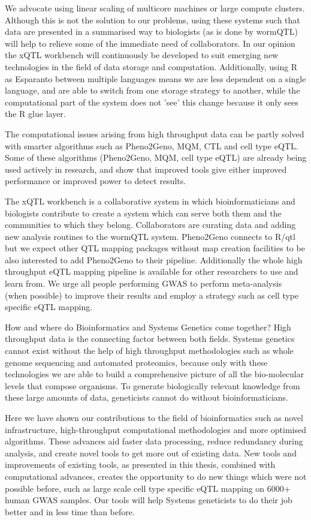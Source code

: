We advocate using linear scaling of multicore machines or large compute clusters. Although this is not the solution to our problems, using these 
systems such that data are presented in a summarised way to biologists (as is done by wormQTL) will help to relieve some of the immediate need 
of collaborators. In our opinion the xQTL workbench will continuously be developed to suit emerging new technologies in the field of data storage 
and computation. Additionally, using R as Esparanto between multiple languages means we are less dependent on a single language, and are able to 
switch from one storage strategy to another, while the computational part of the system does not 'see' this change because it only sees the R 
glue layer.

The computational issues arising from high throughput data can be partly solved with smarter algorithms such as Pheno2Geno, MQM, CTL and cell type eQTL. 
Some of these algorithms (Pheno2Geno, MQM, cell type eQTL) are already being used actively in research, and show that improved tools give either improved 
performance or improved power to detect results. 

The xQTL workbench is a collaborative system in which bioinformaticians and biologists contribute to create a system which can serve both them and 
the communities to which they belong. Collaborators are curating data and adding new analysis routines to the wormQTL system. Pheno2Geno connects to R/qtl 
but we expect other QTL mapping packages without map creation facilities to be also interested to add Pheno2Geno to their pipeline. Additionally the 
whole high throughput eQTL mapping pipeline is available for other researchers to use and learn from. We urge all people performing GWAS to perform 
meta-analysis (when possible) to improve their results and employ a strategy such as cell type specific eQTL mapping. 

How and where do Bioinformatics and Systems Genetics come together? High throughput data is the connecting factor between both fields. Systems 
genetics cannot exist without the help of high throughput methodologies such as whole genome sequencing and automated proteomics, because only 
with these technologies we are able to build a comprehensive picture of all the bio-molecular levels that compose organisms. To generate 
biologically relevant knowledge from these large amounts of data, geneticists cannot do without bioinformaticians. 

Here we have shown our contributions to the field of bioinformatics such as novel infrastructure, high-throughput computational methodologies and 
more optimised algorithms. These advances aid faster data processing, reduce redundancy during analysis, and create novel tools to get more out 
of existing data. New tools and improvements of existing tools, as presented in this thesis, combined with computational advances, creates the 
opportunity to do new things which were not possible before, such as large scale cell type specific eQTL mapping on 6000+ human GWAS samples. Our 
tools will help Systems geneticists to do their job better and in less time than before.  

